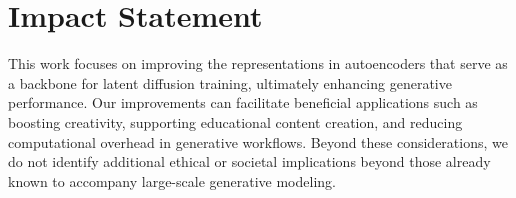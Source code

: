\section*{Impact Statement}

This work focuses on improving the representations in autoencoders that serve as a backbone for latent diffusion training, ultimately enhancing generative performance.
Our improvements can facilitate beneficial applications such as boosting creativity, supporting educational content creation, and reducing computational overhead in generative workflows.
Beyond these considerations, we do not identify additional ethical or societal implications beyond those already known to accompany large-scale generative modeling.
